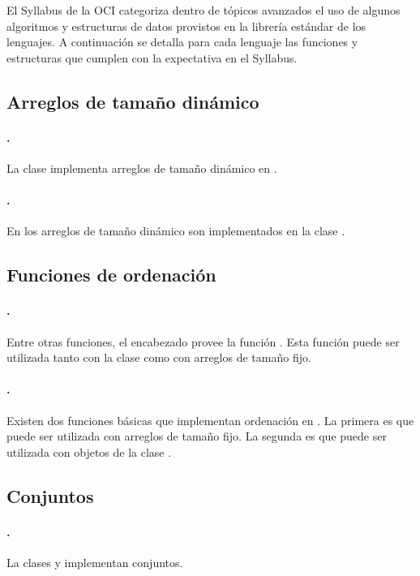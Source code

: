 El Syllabus de la OCI categoriza dentro de tópicos avanzados el uso de algunos
algoritmos y estructuras de datos provistos en la librería estándar de los
lenguajes.
A continuación se detalla para cada lenguaje las funciones y estructuras que
cumplen con la expectativa en el Syllabus.

\subsection{Arreglos de tamaño dinámico}
\label{tech-dynamic-array}
\paragraph{\cpp.} La clase  implementa arreglos de tamaño dinámico en
  \cpp.
\paragraph{\java.} En \java los arreglos de tamaño dinámico son implementados en la
  clase .

\subsection{Funciones de ordenación}
\label{tech-sort-functions}
\paragraph{\cpp.} Entre otras funciones, el encabezado  provee la
  función .
  Esta función puede ser utilizada tanto con la clase  como con
  arreglos de tamaño fijo.
\paragraph{\java.} Existen dos funciones básicas que implementan ordenación en
  \java.
  La primera es  que puede ser utilizada con arreglos de
  tamaño fijo.
  La segunda es  que puede ser utilizada con objetos de
  la clase .
  
\subsection{Conjuntos}
\label{tech-set}
\paragraph{\cpp.} La clases  y  implementan
  conjuntos.
